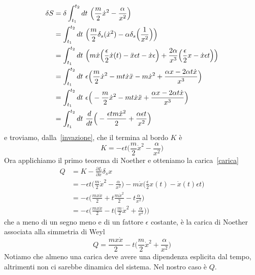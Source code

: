 \begin{example}
\begin{equation*}
\begin{aligned}
        \delta S & = \delta \int_{t_1}^{t_2}dt~ \Big( \frac{m}{2} \dot x^2 - \frac{\alpha}{x^2} \Big) \\ & = \int_{t_1}^{t_2}dt~ \Big( \frac{m}{2} \delta_s (\dot x^2) - \alpha \delta_s \Big (\frac{1}{x^2} \Big) \Big) \\ & = \int_{t_1}^{t_2}dt~ \Big( m \dot x \Big( \frac{\epsilon}{2} \dot x(t) - \ddot x \epsilon t - \dot x \epsilon \Big) + \frac{2 \alpha}{x^3} \Big( \frac{\epsilon}{2} x - \dot x \epsilon t \Big) \Big) \\ & = \int_{t_1}^{t_2}dt~ \epsilon \Big( \frac{m}{2} \dot x^2 - m t \dot x \ddot x - m \dot x^2 + \frac{\alpha x - 2 \alpha t \dot x}{x^3}\Big) \\ & = \int_{t_1}^{t_2}dt~ \epsilon \Big( - \frac{m}{2} \dot x^2 - m t \dot x \ddot x + \frac{\alpha x - 2 \alpha t \dot x}{x^3}\Big) \\ & = \int_{t_1}^{t_2}dt~ \frac{d}{dt} \Big ( - \frac{\epsilon t m \dot x^2}{2} + \frac{\alpha \epsilon t}{x^2} \Big)
    \end{aligned}
    \end{equation*}
        e troviamo, dalla~\eqref{invazione}, che il termina al bordo $K$ è 
    \begin{equation*}
        K = - \epsilon t \Big (\frac{m}{2} \dot x^2 - \frac{\alpha}{x^2} \Big)
    \end{equation*}
        Ora applichiamo il primo teorema di Noether e otteniamo la carica~\eqref{carica} 
    \begin{equation*}
    \begin{aligned}
        Q & = K - \frac{\partial L}{\partial \dot x} \delta_s x \\ & = - \epsilon t \Big (\frac{m}{2} \dot x^2 - \frac{\alpha}{x^2} \Big) - m \dot x \Big (\frac{\epsilon}{2} x(t) - \dot x(t) \epsilon t \Big ) \\ & = - \epsilon \Big ( \frac{m x \dot x }{2} + t \frac{m \dot x^2}{2} - t \frac{\alpha}{x^2} \Big) \\ & = - \epsilon \Big ( \frac{m x \dot x}{2} - t \Big ( \frac{m}{2} \dot x^2 + \frac{\alpha}{x^2} \Big ) \Big )
    \end{aligned}
    \end{equation*}
        che a meno di un segno meno e di un fattore $\epsilon$ costante, è la carica di Noether associata alla simmetria di Weyl
    \begin{equation} \label{carica1}
        Q = \frac{m x \dot x}{2} - t \Big( \frac{m}{2} \dot x^2 + \frac{\alpha}{x^2} \Big)
    \end{equation}
        Notiamo che almeno una carica deve avere una dipendenza esplicita dal tempo, altrimenti non ci sarebbe dinamica del sistema. Nel nostro caso è $Q$.


\end{example}
